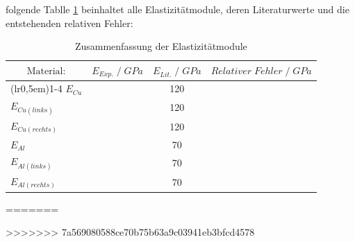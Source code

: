 \justifying folgende Tablle \ref{tab:7} beinhaltet alle Elastizitätmodule, deren Literaturwerte \cite{E_CuAl_Lit} und die entstehenden 
relativen Fehler:

\begin{table}[H]
\centering
    \begin{tabular}{l l c l}
    \toprule
        \multicolumn{1}{c}{$\text{Material:}$} & \multicolumn{1}{c}{$E_{Exp.}\;/\;GPa$} & \multicolumn{1}{c}{$E_{Lit.}\;/\;GPa$} & \multicolumn{1}{c}{$Relativer\;Fehler\;/\;GPa$}\\
        \cmidrule(lr{0,5em}){1-4}
        $E_{Cu}$            & \text{}    & 120   & \text{}\\
        $E_{Cu(links)}$     & \text{}   & 120   & \text{}\\
        $E_{Cu(rechts)}$    & \text{}   & 120   & \text{}\\
        $E_{Al}$            & \text{}    & 70    & \text{}\\
        $E_{Al(links)}$     & \text{}   & 70    & \text{}\\
        $E_{Al(rechts)}$    & \text{}   & 70    & \text{}\\
        \bottomrule
    \end{tabular}
\caption{Zusammenfassung der Elastizitätmodule}
\label{tab:7}
\end{table}
=======


>>>>>>> 7a569080588ce70b75b63a9c03941eb3bfcd4578
\newpage

\printbibliography
